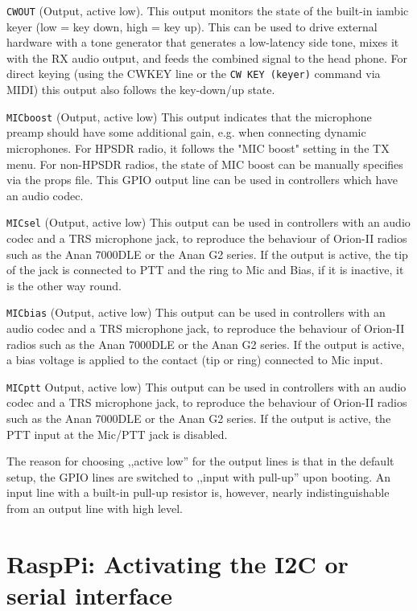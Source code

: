 \documentclass[12pt]{book}
\def\bltt#1{\texttt{\color{blue}#1}}
\begin{document}
\texttt{CWOUT} (Output, active low). This output monitors the state of the built-in iambic keyer
(low = key down, high = key up). This can be used to drive external hardware with a tone generator
that generates a low-latency side tone, mixes it with the RX audio output, and feeds the combined
signal to the head phone. For direct keying (using the CWKEY line or the \bltt{CW KEY (keyer)}
command via MIDI) this output also
follows the key-down/up state.

\texttt{MICboost} (Output, active low) This output indicates that the microphone preamp should have
some additional gain, e.g. when connecting dynamic microphones. For HPSDR radio, it follows the
"MIC boost" setting in the TX menu. For non-HPSDR radios, the state of MIC boost can be manually
specifies via the props file. This GPIO output line can be used in controllers which have an audio codec.

\texttt{MICsel} (Output, active low) This output can be used in controllers with an audio codec and
a TRS microphone jack, to reproduce the behaviour of Orion-II radios such as the Anan 7000DLE or
the Anan G2 series. If the output is active, the tip of the jack is connected to PTT and the ring
to Mic and Bias, if it is inactive, it is the other way round.

\texttt{MICbias} (Output, active low) This output can be used in controllers with an audio codec and
a TRS microphone jack, to reproduce the behaviour of Orion-II radios such as the Anan 7000DLE or
the Anan G2 series. If the output is active, a bias voltage is applied to the contact (tip or ring)
connected to Mic input.

\texttt{MICptt} Output, active low) This output can be used in controllers with an audio codec and
a TRS microphone jack, to reproduce the behaviour of Orion-II radios such as the Anan 7000DLE or
the Anan G2 series. If the output is active, the PTT input at the Mic/PTT jack is disabled.

The reason for choosing ,,active low'' for the output lines is that in the default setup,
the GPIO lines are switched
to ,,input with pull-up'' upon booting. An input line with a built-in pull-up
resistor is, however,
nearly indistinguishable from an output line with high level.


\chapter[RaspPi: Activating I2C]{RaspPi: Activating the I2C or serial interface}
\label{sec:i2c}
\end{document}

